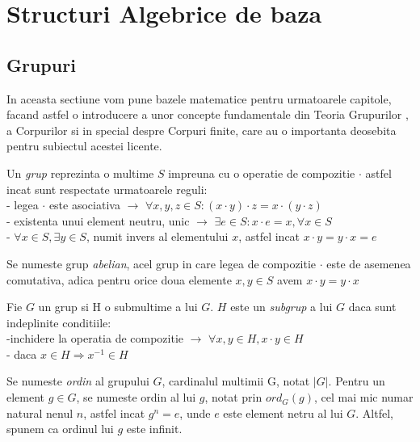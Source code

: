 %
%
\let\textcircled=\pgftextcircled

\chapter{Structuri Algebrice de baza} 
\section{Grupuri}
\label{sec:sec01}
In aceasta sectiune vom pune bazele matematice pentru urmatoarele capitole, facand astfel o introducere a unor concepte fundamentale din Teoria Grupurilor , a Corpurilor si in special despre Corpuri finite, care au o importanta deosebita pentru subiectul acestei licente.
\begin{dfn}
Un \textit{grup} reprezinta o multime $S$ impreuna cu o operatie de compozitie $\cdot$ astfel incat sunt respectate urmatoarele reguli:
\\ - legea $\cdot$ este asociativa $\rightarrow$ $\forall x, y, z\in S: (x\cdot y)\cdot z = x\cdot (y \cdot z)$
\\ - existenta unui element neutru, unic $\rightarrow$ $\exists e\in S: x \cdot e = x, \forall x\in S$
\\ - $\forall x\in S, \exists y\in S$, numit invers al elementului $x$, astfel incat $x\cdot y = y\cdot x = e$
\end{dfn}

\begin{dfn}
Se numeste grup \textit{abelian}, acel grup in care legea de compozitie $\cdot$ este de asemenea comutativa, adica pentru orice doua elemente
$x, y \in S$ avem $x \cdot y = y \cdot x$
\end{dfn}

\begin{dfn}
Fie $G$ un grup si H o submultime a lui $G$. $H$ este un \textit{subgrup} a lui $G$ daca sunt indeplinite conditiile:
\\ -inchidere la operatia de compozitie $\rightarrow$ $\forall x, y \in H, x \cdot y \in H$
\\ - daca $x \in H \Rightarrow x^{-1} \in H$
\end{dfn}

\begin{dfn}
Se numeste \textit{ordin} al grupului $G$, cardinalul multimii G, notat $|G|$. Pentru un element $g \in G$, se numeste ordin al lui $g$, notat prin $ord_G(g)$, cel mai
mic numar natural nenul $n$, astfel incat $g^n = e$, unde $e$ este element netru al lui $G$. Altfel, spunem ca ordinul lui $g$ este infinit.
\end{dfn}

